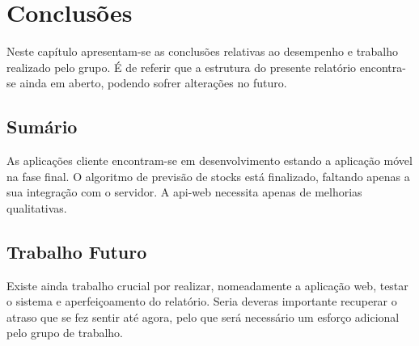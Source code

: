 %
%
\chapter{Conclusões} \label{cap4}

Neste capítulo apresentam-se as conclusões relativas ao desempenho e trabalho realizado pelo grupo. É de referir que a estrutura do presente relatório encontra-se ainda em aberto, podendo sofrer alterações no futuro.

\section{Sumário}\label{sec41}

As aplicações cliente encontram-se em desenvolvimento estando a aplicação móvel na fase final. O algoritmo de previsão de stocks está finalizado, faltando apenas a sua integração com o servidor. A \gls{api-web} necessita apenas de melhorias qualitativas.

\section{Trabalho Futuro}\label{sec42}

Existe ainda trabalho crucial por realizar, nomeadamente a aplicação web, testar o sistema e aperfeiçoamento do relatório. Seria deveras importante recuperar o atraso que se fez sentir até agora, pelo que será necessário um esforço adicional pelo grupo de trabalho.